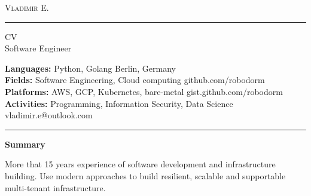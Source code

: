\documentclass[10pt,A4]{article}
\newcommand{\cvsection}[1]
{
	\begin{center}
		\large\textcolor{sectcol}{\textbf{#1}}
	\end{center}
}
\newcommand{\metasection}[2]
{
\footnotesize{#2} \hspace*{\fill} \footnotesize{#1}\\[1pt]
}
\begin{document}
\pagestyle{fancy}	




\vspace{-8pt}
\begin{center}
	\HUGE \textsc{Vladimir E.} \textcolor{sectcol}{\rule[-1mm]{1mm}{0.9cm}} \textsc{CV}\\[2pt]
	\small Software Engineer
\end{center}

\vspace{6pt}

\metasection{Berlin, Germany}{\textbf{Languages:} Python, Golang}
\metasection{github.com/robodorm}{\textbf{Fields:} Software Engineering, Cloud computing}
\metasection{gist.github.com/robodorm}{\textbf{Platforms:} AWS, GCP, Kubernetes, bare-metal}
\metasection{vladimir.e@outlook.com}{\textbf{Activities:} Programming, Information Security, Data Science}
\vspace{-2pt}
\textcolor{softcol}{\hrule}
\vspace{6pt}

\normalsize

\vspace{-6pt}
\cvsection{Summary}
More that 15 years experience of software development and infrastructure building. Use modern approaches to build resilient, scalable and supportable multi-tenant infrastructure. \\
\end{document}
